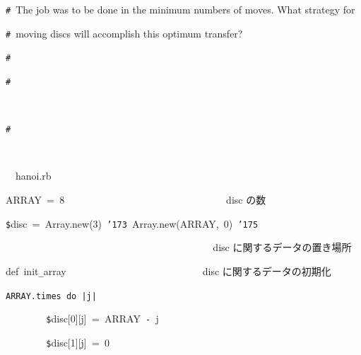 \documentclass{article}
\begin{document}
\noindent
\mbox{}{\tt\#}\  {}\hspace{\leftmargini}The job was to be done in the minimum numbers of moves. What strategy for  \rm\mc 

\noindent
\mbox{}{\tt\#}\  {}\hspace{\leftmargini}moving discs will accomplish this optimum transfer?  \rm\mc 

\noindent
\mbox{}{\tt\#}\  {}  \rm\mc 

\noindent
\mbox{}{\tt\#}
\tt\mc 

\noindent
\mbox{}\rm\mc {\tt\#}\  {}%

\noindent
\mbox{}{\tt\#}
\tt\mc 

\noindent
\mbox{}\rm\mc {\tt\#}\  \hrulefill  \rm\mc 

\noindent
\mbox{}\tt\mc \hfill

\noindent
\mbox{}\hfill

\noindent
\mbox{}\rm\mc {\tt\#}\  \hrulefill\ hanoi.rb \ \hrulefill \rm\mc 

\noindent
\mbox{}\tt\mc \hfill

\noindent
\mbox{}\hfill

\noindent
\mbox{}ARRAY{\tt\mc \ }={\tt\mc \ }8{\tt\mc \ \ \ \ \ \ \ \ \ \ \ \ \ \ \ \ \ \ \ \ \ \ \ \ \ \ \ \ \ \ \ }\rm\mc {\tt\#}\  {}disc の数 \hfill  \rm\mc 

\noindent
\mbox{}\tt\mc \hfill

\noindent
\mbox{}{\tt\$}disc{\tt\mc \ }={\tt\mc \ }Array.new(3){\tt\mc \ }{\tt\char'173}{\tt\mc \ }Array.new(ARRAY,{\tt\mc \ }0){\tt\mc \ }{\tt\char'175}

\noindent
\mbox{}{\tt\mc \ \ \ \ \ \ \ \ \ \ \ \ \ \ \ \ \ \ \ \ \ \ \ \ \ \ \ \ \ \ \ \ \ \ \ \ \ \ \ \ }\rm\mc {\tt\#}\  {}disc に関するデータの置き場所 \hfill  \rm\mc 

\noindent
\mbox{}\tt\mc \hfill

\noindent
\mbox{}def{\tt\mc \ }init{\tt\_}array{\tt\mc \ \ \ \ \ \ \ \ \ \ \ \ \ \ \ \ \ \ \ \ \ \ \ \ \ \ }\rm\mc {\tt\#}\  {}disc に関するデータの初期化 \hfill  \rm\mc 

\noindent
\mbox{}\tt\mc {\tt\mc \ \ \ \ }ARRAY.times{\tt\mc \ }do{\tt\mc \ }{\tt |}j{\tt |}

\noindent
\mbox{}{\tt\mc \ \ \ \ \ \ \ \ }{\tt\$}disc[0][j]{\tt\mc \ }={\tt\mc \ }ARRAY{\tt\mc \ }{\tt -}{\tt\mc \ }j

\noindent
\mbox{}{\tt\mc \ \ \ \ \ \ \ \ }{\tt\$}disc[1][j]{\tt\mc \ }={\tt\mc \ }0
\end{document}
